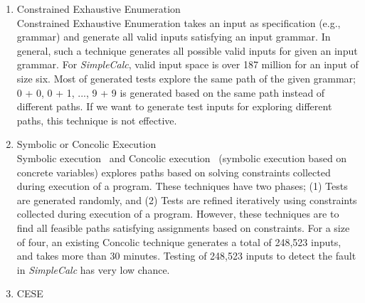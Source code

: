 \begin{enumerate}
  \item{Constrained Exhaustive Enumeration} \\
  
Constrained Exhaustive Enumeration takes an input as specification (e.g., grammar) and generate all valid inputs satisfying an input grammar. In general, such a technique generates all possible valid inputs for given an input grammar. For \textit{SimpleCalc}, valid input space is over 187 million for an input of size six.  Most of generated tests explore the same path of the given grammar; 0 + 0, 0 + 1, ..., 9 + 9 is generated based on the same path instead of different paths. If we want to generate test inputs for exploring different paths, this technique is not effective. 

  
  \item{Symbolic or Concolic Execution} \\

Symbolic execution~\cite{system} and Concolic execution~\cite{dart, cute} (symbolic execution based on concrete variables) explores paths based on solving constraints collected during execution of a program. These techniques have two phases; (1) Tests are generated randomly, and (2) Tests are refined iteratively using constraints collected during execution of a program. However, these techniques are to find all feasible paths satisfying assignments based on constraints. For a size of four, an existing Concolic technique generates a total of 248,523 inputs, and takes more than 30 minutes. Testing of 248,523 inputs to detect the fault in \textit{SimpleCalc} has very low chance.
   
 
  \item{CESE} \\
  

\end{enumerate}
